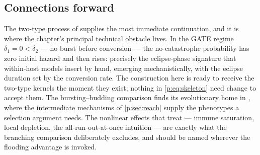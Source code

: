 \subsection{Connections forward}
\label{p:sec:forward}

The two-type process of \ChTwoType{} supplies the most immediate
continuation, and it is where the chapter's principal technical obstacle
lives. In the GATE regime $\delta_1=0<\delta_2$ --- no burst before
conversion --- the no-catastrophe probability has zero initial hazard and
then rises: precisely the eclipse-phase signature that within-host models
insert by hand, emerging mechanistically, with the eclipse duration set by
the conversion rate. The construction here is ready to receive the two-type
kernels the moment they exist; nothing in \cref{p:eq:skeleton} need change
to accept them. The bursting--budding comparison finds its evolutionary home
in \ChPath{}, where the intermediate mechanisms of \cref{p:sec:reach} supply
the phenotypes a selection argument needs. The nonlinear effects that
 treat --- immune saturation,
local depletion, the all-run-out-at-once intuition --- are exactly what the
branching comparison deliberately excludes, and should be named wherever the
flooding advantage is invoked.

\FloatBarrier
